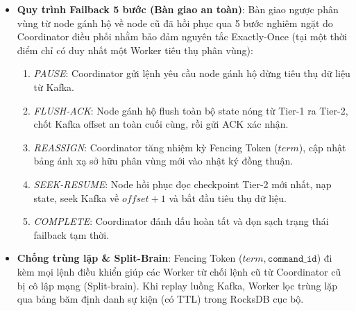 \documentclass[9pt,a4paper]{article}
\begin{document}
\begin{itemize}[leftmargin=*]
    \item \textbf{Quy trình Failback 5 bước (Bàn giao an toàn)}: Bàn giao ngược phân vùng từ node gánh hộ về node cũ đã hồi phục qua 5 bước nghiêm ngặt do Coordinator điều phối nhằm bảo đảm nguyên tắc Exactly-Once (tại một thời điểm chỉ có duy nhất một Worker tiêu thụ phân vùng):
    \begin{enumerate}[leftmargin=*,nosep]
        \item \emph{PAUSE}: Coordinator gửi lệnh yêu cầu node gánh hộ dừng tiêu thụ dữ liệu từ Kafka.
        \item \emph{FLUSH-ACK}: Node gánh hộ flush toàn bộ state nóng từ Tier-1 ra Tier-2, chốt Kafka offset an toàn cuối cùng, rồi gửi ACK xác nhận.
        \item \emph{REASSIGN}: Coordinator tăng nhiệm kỳ Fencing Token ($term$), cập nhật bảng ánh xạ sở hữu phân vùng mới vào nhật ký đồng thuận.
        \item \emph{SEEK-RESUME}: Node hồi phục đọc checkpoint Tier-2 mới nhất, nạp state, seek Kafka về $offset + 1$ và bắt đầu tiêu thụ dữ liệu.
        \item \emph{COMPLETE}: Coordinator đánh dấu hoàn tất và dọn sạch trạng thái failback tạm thời.
    \end{enumerate}
    \item \textbf{Chống trùng lặp \& Split-Brain}: Fencing Token ($term, \texttt{command\_id}$) đi kèm mọi lệnh điều khiển giúp các Worker từ chối lệnh cũ từ Coordinator cũ bị cô lập mạng (Split-brain). Khi replay luồng Kafka, Worker lọc trùng lặp qua bảng băm định danh sự kiện (có TTL) trong RocksDB cục bộ.
\end{itemize}
\end{document}
